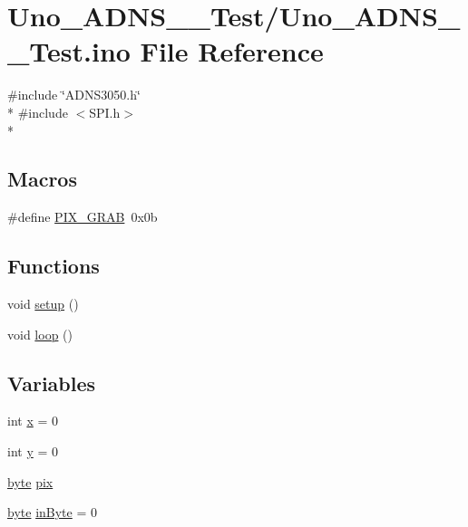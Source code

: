 \hypertarget{Uno__ADNS__3050__Test_8ino}{\section{Uno\-\_\-\-A\-D\-N\-S\-\_\-\_\-\-Test/\-Uno\-\_\-\-A\-D\-N\-S\-\_\-\_\-\-Test.ino File Reference}
\label{Uno__ADNS__3050__Test_8ino}
}
{\ttfamily \#include \char`\"{}A\-D\-N\-S3050.\-h\char`\"{}}\\*
{\ttfamily \#include $<$S\-P\-I.\-h$>$}\\*
\subsection*{Macros}
\begin{DoxyCompactItemize}
\item 
\#define \hyperlink{Uno__ADNS__3050__Test_8ino_a67df1f251f0733b2e7e4ed591565c1de}{P\-I\-X\-\_\-\-G\-R\-A\-B}~0x0b
\end{DoxyCompactItemize}
\subsection*{Functions}
\begin{DoxyCompactItemize}
\item 
void \hyperlink{Uno__ADNS__3050__Test_8ino_a4fc01d736fe50cf5b977f755b675f11d}{setup} ()
\item 
void \hyperlink{Uno__ADNS__3050__Test_8ino_afe461d27b9c48d5921c00d521181f12f}{loop} ()
\end{DoxyCompactItemize}
\subsection*{Variables}
\begin{DoxyCompactItemize}
\item 
int \hyperlink{Uno__ADNS__3050__Test_8ino_a6150e0515f7202e2fb518f7206ed97dc}{x} = 0
\item 
int \hyperlink{Uno__ADNS__3050__Test_8ino_a0a2f84ed7838f07779ae24c5a9086d33}{y} = 0
\item 
\hyperlink{Arduino_8h_ab8ef12fab634c171394422d0ee8baf94}{byte} \hyperlink{Uno__ADNS__3050__Test_8ino_afff71f4b34d167a8e437bdb5c50d31be}{pix}
\item 
\hyperlink{Arduino_8h_ab8ef12fab634c171394422d0ee8baf94}{byte} \hyperlink{Uno__ADNS__3050__Test_8ino_a62cd173143ff9c15a38fd17ab56970c9}{in\-Byte} = 0
\end{DoxyCompactItemize}


